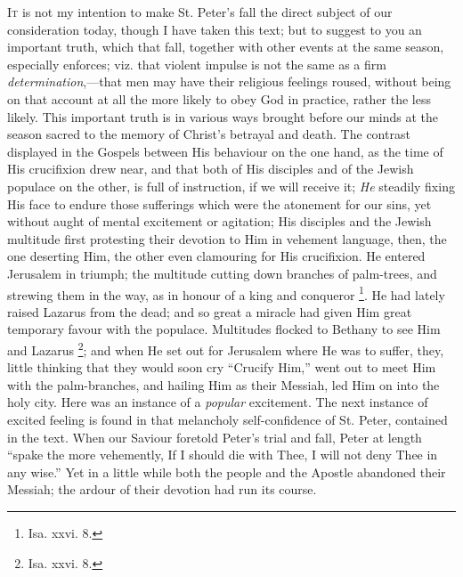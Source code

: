 I\textsc{t} is not my intention to make St. Peter's fall the
direct subject of our consideration today, though I have
taken this text; but to suggest to you an important
truth, which that fall, together with other events at the
same season, especially enforces; viz. that violent
impulse is not the same as a firm \emph{determination},—that
men may have their religious feelings roused, without
being on that account at all the more likely to obey God
in practice, rather the less likely. This important truth
is in various ways brought before our minds at the season
sacred to the memory of Christ's betrayal and death. The
contrast displayed in the Gospels between His behaviour
on the one hand, as the time of His crucifixion drew
near, and that both of His disciples and of the Jewish
populace on the other, is full of instruction, if we will
receive it; \emph{He} steadily fixing His face to endure
those sufferings which were the atonement for our sins,
yet without aught of mental excitement or agitation; His
disciples and the Jewish multitude first protesting their
devotion to Him in vehement language, then, the one
deserting Him, the other even clamouring for His
crucifixion. He entered Jerusalem in triumph; the
multitude cutting down branches of palm-trees, and
strewing them in the way, as in honour of a king and
conqueror \footnote{Isa. xxvi. 8.}. He had lately
raised Lazarus from the dead; and so great a miracle had
given Him great temporary favour with the populace.
Multitudes flocked to Bethany to see Him and Lazarus \footnote{Isa. xxvi. 8.}; and when He set out for Jerusalem
where He was to suffer, they, little thinking that they
would soon cry ``Crucify Him,'' went out to meet
Him with the palm-branches, and hailing Him as their
Messiah, led Him on into the holy city. Here was an
instance of a \emph{popular} excitement. The next
instance of excited feeling is found in that melancholy
self-confidence of St. Peter, contained in the text. When
our Saviour foretold Peter's trial and fall, Peter at
length ``spake the more vehemently, If I should die
with Thee, I will not deny Thee in any wise.'' Yet in
a little while both the people and the Apostle abandoned
their Messiah; the ardour of their devotion had run its
course.

